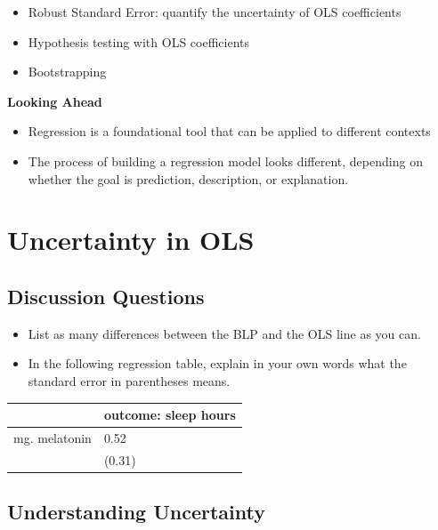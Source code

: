 \documentclass[
]{book}
\providecommand{\tightlist}{%
  \setlength{\itemsep}{0pt}\setlength{\parskip}{0pt}}
\theoremstyle{definition}
\theoremstyle{definition}
\theoremstyle{definition}
\theoremstyle{definition}
\theoremstyle{remark}
\begin{document}
\begin{itemize}
\tightlist
\item
  Robust Standard Error: quantify the uncertainty of OLS coefficients
\item
  Hypothesis testing with OLS coefficients
\item
  Bootstrapping
\end{itemize}

\textbf{Looking Ahead}

\begin{itemize}
\tightlist
\item
  Regression is a foundational tool that can be applied to different contexts
\item
  The process of building a regression model looks different, depending on whether the goal is prediction, description, or explanation.
\end{itemize}

\hypertarget{uncertainty-in-ols}{%
\section{Uncertainty in OLS}\label{uncertainty-in-ols}}

\hypertarget{discussion-questions-2}{%
\subsection{Discussion Questions}\label{discussion-questions-2}}

\begin{itemize}
\tightlist
\item
  List as many differences between the BLP and the OLS line as you can.
\item
  In the following regression table, explain in your own words what the standard error in parentheses means.
\end{itemize}

\begin{longtable}[]{@{}ll@{}}
\toprule
& outcome: sleep hours \\
\midrule
\endhead
mg. melatonin & 0.52 \\
& (0.31) \\
\bottomrule
\end{longtable}

\hypertarget{understanding-uncertainty}{%
\subsection{Understanding Uncertainty}\label{understanding-uncertainty}}
\end{document}
